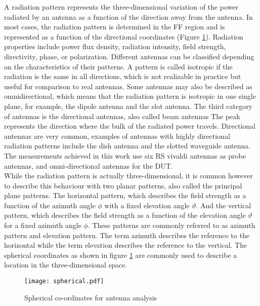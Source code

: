 A radiation pattern represents the three-dimensional variation of the power radiated by an antenna as a function of the direction away from the antenna. In most cases, the radiation pattern is determined in the \acs{FF} region and is represented as a function of the directional coordinates (Figure \ref{spherical}). Radiation properties include power flux density, radiation intensity, field strength, directivity, phase, or polarization. Different antennas can be classified depending on the characteristics of their patterns. A pattern is called isotropic if the radiation is the same in all directions, which is not realizable in practice but useful for comparison to real antennas. Some antennas may also be described as omnidirectional, which means that the radiation pattern is isotropic in one single plane, for example, the dipole antenna and the slot antenna. The third category of antennas is the directional antennas, also called beam antennas The peak represents the direction where the bulk of the radiated power travels. Directional antennas are very common, examples of antennas with highly directional radiation patterns include the dish antenna and the slotted waveguide antenna. The measurements achieved in this work use six \acs{RS}\textregistered{} vivaldi antennas as probe antennas, and omni-directional antennas for the \acs{DUT}. \\

While the radiation pattern is actually three-dimensional, it is common however to describe this behaviour with two planar patterns, also called the principal plane patterns. The horizontal pattern, which describes the field strength as a function of the azimuth angle $\phi$  with a fixed elevation angle $ \vartheta$. And the vertical pattern, which describes the field strength as a function of the elevation angle $\vartheta$  for a fixed azimuth angle $\phi$. These patterns are commonly referred to as azimuth pattern and elevation pattern. The term azimuth describes the reference to the horizontal while the term elevation describes the reference to the vertical. The spherical coordinates as shown in figure \ref{spherical} are commonly used to describe a location in the three-dimensional space.

\begin{figure}[H]
	\begin{center}
	\vspace{-1cm}
		\texttt{[image: spherical.pdf]}
			\vspace{-1cm} 	\caption{\label{spherical}Spherical co-ordinates for antenna analysis \cite{balanis}}
	\end{center}
\end{figure}

